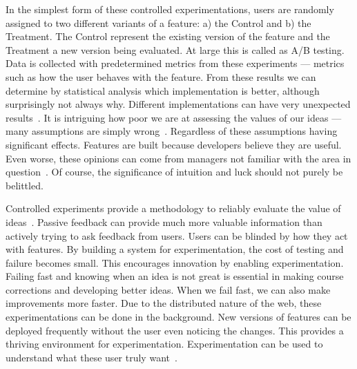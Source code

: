 \documentclass[english]{tktltiki2}
\begin{document}
In the simplest form of these controlled experimentations, users are randomly assigned to two different variants of a feature: a) the Control and b) the Treatment. The Control represent the existing version of the feature and the Treatment a new version being evaluated. At large this is called as A/B testing. Data is collected with predetermined metrics from these experiments — metrics such as how the user behaves with the feature. From these results we can determine by statistical analysis which implementation is better, although surprisingly not always why. Different implementations can have very unexpected results~\cite{KLS09, KDF12, McK12}. It is intriguing how poor we are at assessing the values of our ideas — many assumptions are simply wrong~\cite{BE12, KDF12}. Regardless of these assumptions having significant effects. Features are built because developers believe they are useful. Even worse, these opinions can come from managers not familiar with the area in question~\cite{KLS09, BE12, Bos12}. Of course, the significance of intuition and luck should not purely be belittled.

Controlled experiments provide a methodology to reliably evaluate the value of ideas~\cite{KR04, KLS09, McK12, Rho14, Wan14}. Passive feedback can provide much more valuable information than actively trying to ask feedback from users. Users can be blinded by how they act with features. By building a system for experimentation, the cost of testing and failure becomes small. This encourages innovation by enabling experimentation. Failing fast and knowing when an idea is not great is essential in making course corrections and developing better ideas. When we fail fast, we can also make improvements more faster. Due to the distributed nature of the web, these experimentations can be done in the background. New versions of features can be deployed frequently without the user even noticing the changes. This provides a thriving environment for experimentation. Experimentation can be used to understand what these user truly want~\cite{Wan14}.
\end{document}
